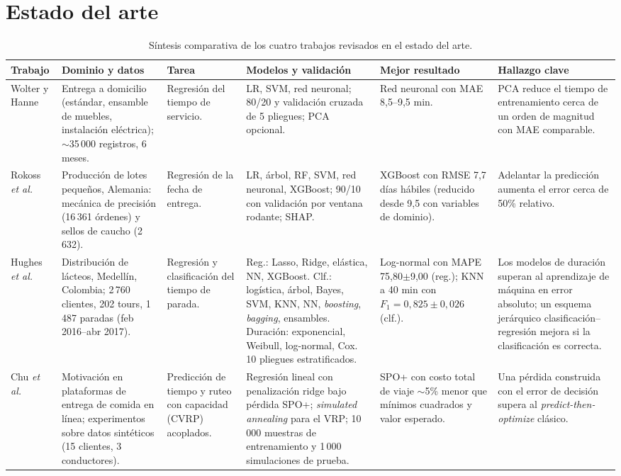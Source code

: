 \documentclass[journal]{IEEEtran}
\begin{document}
\section{Estado del arte}
\begin{table}[!t]
\caption{Síntesis comparativa de los cuatro trabajos revisados en el estado del arte.}
\label{tab:soa}
\centering\scriptsize
\setlength{\tabcolsep}{4pt}
\begin{tabular}{p{1.7cm}p{3.1cm}p{2.4cm}p{3.5cm}p{2.6cm}p{2.6cm}}
\toprule
Trabajo & Dominio y datos & Tarea & Modelos y validación & Mejor resultado & Hallazgo clave \\
\midrule
Wolter y Hanne \cite{wolter2024} & Entrega a domicilio (estándar, ensamble de muebles, instalación eléctrica); $\sim$35\,000 registros, 6 meses. & Regresión del tiempo de servicio. & LR, SVM, red neuronal; 80/20 y validación cruzada de 5 pliegues; PCA opcional. & Red neuronal con MAE 8,5--9,5 min. & PCA reduce el tiempo de entrenamiento cerca de un orden de magnitud con MAE comparable. \\
\addlinespace
Rokoss \emph{et al.} \cite{rokoss2024} & Producción de lotes pequeños, Alemania: mecánica de precisión (16\,361 órdenes) y sellos de caucho (2\,632). & Regresión de la fecha de entrega. & LR, árbol, RF, SVM, red neuronal, XGBoost; 90/10 con validación por ventana rodante; SHAP. & XGBoost con RMSE 7,7 días hábiles (reducido desde 9,5 con variables de dominio). & Adelantar la predicción aumenta el error cerca de 50\% relativo. \\
\addlinespace
Hughes \emph{et al.} \cite{hughes2019} & Distribución de lácteos, Medellín, Colombia; 2\,760 clientes, 202 tours, 1\,487 paradas (feb 2016--abr 2017). & Regresión y clasificación del tiempo de parada. & Reg.: Lasso, Ridge, elástica, NN, XGBoost. Clf.: logística, árbol, Bayes, SVM, KNN, NN, \textit{boosting}, \textit{bagging}, ensambles. Duración: exponencial, Weibull, log-normal, Cox. 10 pliegues estratificados. & Log-normal con MAPE 75,80$\pm$9,00 (reg.); KNN a 40 min con $F_1=0{,}825\pm0{,}026$ (clf.). & Los modelos de duración superan al aprendizaje de máquina en error absoluto; un esquema jerárquico clasificación--regresión mejora si la clasificación es correcta. \\
\addlinespace
Chu \emph{et al.} \cite{chu2023} & Motivación en plataformas de entrega de comida en línea; experimentos sobre datos sintéticos (15 clientes, 3 conductores). & Predicción de tiempo y ruteo con capacidad (CVRP) acoplados. & Regresión lineal con penalización ridge bajo pérdida SPO+; \textit{simulated annealing} para el VRP; 10\,000 muestras de entrenamiento y 1\,000 simulaciones de prueba. & SPO+ con costo total de viaje $\sim$5\% menor que mínimos cuadrados y valor esperado. & Una pérdida construida con el error de decisión supera al \textit{predict-then-optimize} clásico. \\
\bottomrule
\end{tabular}
\end{table}
\end{document}
